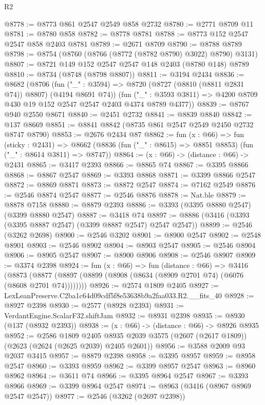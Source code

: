 \begin{lexlean}{R2}
\begin{coremodule}
@8778 := @8773 @861 @2547 @2549 @858 @2732
@8780 := @2771 @8709 @11
@8781 := @8780 @858
@8782 := @8778 @8781
@8788 := @8773 @152 @2547 @2547 @858 @2403 @8781
@8789 := @2671 @8709
@8790 := @8788 @8789
@8798 := @8754 (@8760 (@8766 (@8772 (@8782 @8790) @3022) @8790) @3131)
@8807 := @8721 @149 @152 @2547 @2547 @148 @2403 (@8780 @148) @8789
@8810 := @8734 (@8748 (@8798 @8807))
@8811 := @3194 @2434
@8836 := @8682
    (@8706
      (fun ("_" : @3594) => @8720 (@8727 (@8810 (@8811 @2831 @74)) @8807) (@4194 @8691 @74))
      (fun ("_" : @3593 @3811) => @4200 @8709 @430 @19 @152 @2547 @2547 @2403 @4374 @8789 @4377))
@8839 := @8767 @940 @2550 @8671
@8840 := @2451 @2732
@8841 := @8839 @8840
@8842 := @137 @8669
@8851 := @8841 @8842 (@8735 @861 @2547 @2549 @2450 @2732 @8747 @8790)
@8853 := @2676 @2434 @87
@8862 := fun (x : @66) =>
  fun (sticky : @2431) =>
  @8662 (@8836 (fun ("_" : @8615) => @8851 @8853) (fun ("_" : @8614 @3811) => @8747))
@8864 := (x : @66) -> (distance : @66) -> @2431
@8865 := @3417 @2393
@8866 := @8865 @74
@8867 := @3395 @8866
@8868 := @8867 @2547
@8869 := @3393 @8868
@8871 := @3399 @8866 @2547
@8872 := @8869 @8871
@8873 := @8872 @2547
@8874 := @7162 @2549
@8876 := @2546 @8874 @2547
@8877 := @2546 @8876
@8878 := Nat.ble
@8879 := @8878 @7158
@8880 := @8879 @2393
@8886 := @3393 (@3395 @8880 @2547) (@3399 @8880 @2547)
@8887 := @3418 @74
@8897 := @8886 (@3416 (@3393 (@3395 @8887 @2547) (@3399 @8887 @2547) @2547 @2547))
@8899 := @2546 (@3262 @2698)
@8900 := @2546 @3202
@8901 := @8900 @2547
@8902 := @2548 @8901
@8903 := @2546 @8902
@8904 := @8903 @2547
@8905 := @2546 @8904
@8906 := @8905 @2547
@8907 := @8900 @8906
@8908 := @2546 @8907
@8909 := @3374 @2398
@8924 := fun (x : @66) =>
  fun (distance : @66) =>
  @3416 (@8873 (@8877 (@8897 (@8899 (@8908 (@8634 (@8909 @2701 @74) (@6076 (@8608 @2701 @74))))))))
@8926 := @2574 @1809 @2405
@8927 := LexLeanPreserve.C2ba1c64d09cdf5f8e53638b9a2faa033.R2.__fits_40
@8928 := @8927 @2398
@8930 := @2577 (@8928 @2393)
@8931 := VerdantEngine.ScalarF32.shiftJam
@8932 := @8931 @2398
@8935 := @8930 (@137 (@8932 @2393))
@8938 := (x : @66) -> (distance : @66) -> @8926 @8935
@8952 := @2586
    @1809
    @2405
    @8935
    @2039
    @3575
    (@2607 (@2617 @1809))
    (@2623 (@2624 (@2625 @2039) @2405 @2601))
@8956 := @3588 @2009 @93 @2037 @3415
@8957 := @8879 @2398
@8958 := @3395 @8957
@8959 := @8958 @2547
@8960 := @3393 @8959
@8962 := @3399 @8957 @2547
@8963 := @8960 @8962
@8964 := @3611 @74
@8966 := @3395 @8964 @2547
@8967 := @3393 @8966
@8969 := @3399 @8964 @2547
@8974 := @8963 (@3416 (@8967 @8969 @2547 @2547))
@8977 := @2546 (@3262 (@2697 @2398))

\end{coremodule}
\end{lexlean}
